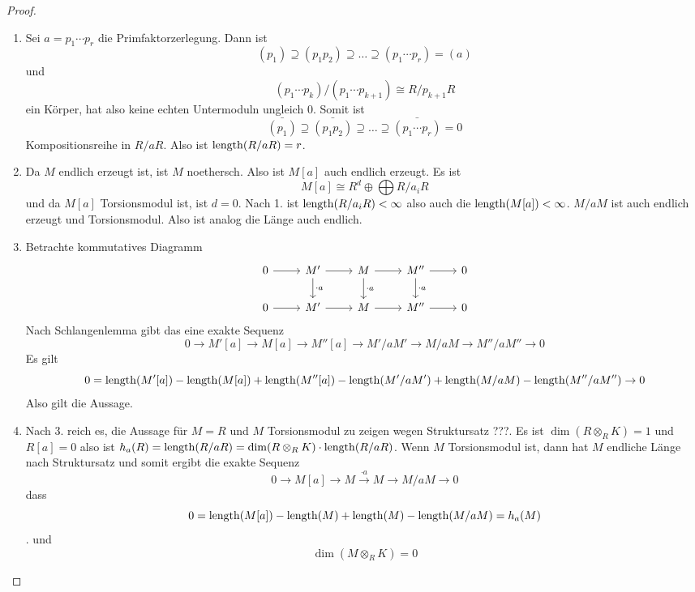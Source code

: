 \begin{proof}
    \begin{enumerate}
        \item Sei \(a=p_1\cdots p_r\) die Primfaktorzerlegung. Dann ist \[(p_1)\supseteq (p_1p_2)\supseteq \dots\supseteq (p_1\cdots p_r)=(a)\] und 
        \[(p_1\cdots p_k)/(p_1\cdots p_{k+1})\cong R/p_{k+1}R\] ein Körper, hat also keine echten Untermoduln ungleich \(0\).
        Somit ist \[\bar{(p_1)}\supseteq \bar{(p_1p_2)}\supseteq \dots\supseteq \bar{(p_1\cdots p_r)}=0\] Kompositionsreihe in \(R/aR\). Also ist \(\operatorname{length}(R/aR)=r\).
        \item Da \(M\) endlich erzeugt ist, ist \(M\) noethersch. Also ist \(M[a]\) auch endlich erzeugt. Es ist 
        \[M[a]\cong R^d\oplus\bigoplus R/a_iR\] und da \(M[a]\) Torsionsmodul ist, ist \(d=0\).
        Nach 1. ist \(\operatorname{length}(R/a_iR)<\infty\) also auch die \(\operatorname{length}(M[a])<\infty\).
        \(M/aM\) ist auch endlich erzeugt und Torsionsmodul. Also ist analog die Länge auch endlich.
        \item Betrachte kommutatives Diagramm 
        $$%
\begin{tikzcd}
0 \arrow[r] & M' \arrow[r] \arrow[d, "\cdot a"] & M \arrow[r] \arrow[d, "\cdot a"] & M'' \arrow[r] \arrow[d, "\cdot a"] & 0 \\
0 \arrow[r] & M' \arrow[r]                      & M \arrow[r]                      & M'' \arrow[r]                      & 0
\end{tikzcd}$$
Nach Schlangenlemma gibt das eine exakte Sequenz 
\[0\to M'[a]\to M[a]\to M''[a]\to M'/aM'\to M/aM\to M''/aM''\to 0\]
Es gilt \[0=\operatorname{length}(M'[a])-\operatorname{length}(M[a])+\operatorname{length}(M''[a])-\operatorname{length}(M'/aM')+\operatorname{length}(M/aM)-\operatorname{length}(M''/aM'')\to 0\] 
Also gilt die Aussage.
\item Nach 3. reich es, die Aussage für \(M=R\) und \(M\) Torsionsmodul zu zeigen wegen Struktursatz ???.
Es ist \(\dim(R\otimes_RK)=1\) und \(R[a]=0\) also ist \(h_a(R)=\operatorname{length}(R/aR)=\dim(R\otimes_RK)\cdot\operatorname{length}(R/aR)\).
Wenn \(M\) Torsionsmodul ist, dann hat \(M\) endliche Länge nach Struktursatz und somit ergibt die exakte Sequenz 
\[0\to M[a]\to M\stackrel{\cdot a}{\to}M\to M/aM\to 0\] dass 
\[0=\operatorname{length}(M[a])-\operatorname{length}(M)+\operatorname{length}(M)-\operatorname{length}(M/aM)=h_a(M)\].
und \[\dim(M\otimes _RK)=0\]
    \end{enumerate}
\end{proof}
